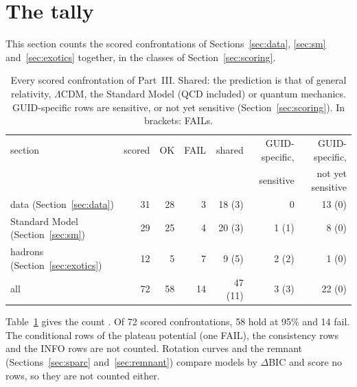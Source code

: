 \section{The tally}\label{sec:tally}

This section counts the scored confrontations of Sections~\ref{sec:data}, \ref{sec:sm} and~\ref{sec:exotics} together, in the classes of
Section~\ref{sec:scoring}.

\begin{table}[h]
\centering\small
\caption{Every scored confrontation of Part~III. Shared: the prediction is that of general relativity, $\Lambda$CDM, the Standard Model
(QCD included) or quantum mechanics. GUID-specific rows are sensitive, or not yet sensitive (Section~\ref{sec:scoring}). In brackets: FAILs.}
\label{tab:tally}
\begin{tabular}{@{}lrrrrrr@{}}
\toprule
section & scored & OK & FAIL & shared & GUID-specific, & GUID-specific, \\
 & & & & & sensitive & not yet sensitive \\
\midrule
data (Section~\ref{sec:data}) & 31 & 28 & 3 & 18 (3) & 0 & 13 (0) \\
Standard Model (Section~\ref{sec:sm}) & 29 & 25 & 4 & 20 (3) & 1 (1) & 8 (0) \\
hadrons (Section~\ref{sec:exotics}) & 12 & 5 & 7 & 9 (5) & 2 (2) & 1 (0) \\
\midrule
all & 72 & 58 & 14 & 47 (11) & 3 (3) & 22 (0) \\
\bottomrule
\end{tabular}
\end{table}

Table~\ref{tab:tally} gives the count . Of 72 scored confrontations, 58 hold at 95\% and 14 fail. The conditional rows of the
plateau potential (one FAIL), the consistency rows and the INFO rows are not counted. Rotation curves and the remnant
(Sections~\ref{sec:sparc} and~\ref{sec:remnant}) compare models by $\Delta$BIC and score no rows, so they are not counted either.

